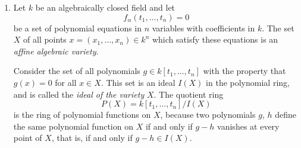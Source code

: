 \begin{enumerate}
\begin{enumerate}
\item Let $f\in C(X)$; let
\[
 U_f=\{x\in X:f(x)\neq0\}
\]
and let
\[
 \widetilde U_f=\{\mathfrak m\in\widetilde X:f\notin\mathfrak m\}.
\]
Show that $\mu(U_f)=\widetilde U_f$. The open sets $U_f$ (resp. $\widetilde U_f$) form a basis of the topology of $X$ (resp. $\widetilde X$) and therefore $\mu$ is a homeomorphism.

Thus $X$ can be reconstructed from the ring of functions $C(X)$.
\end{enumerate}

\noindent\textit{Affine algebraic varieties}

\item Let $k$ be an algebraically closed field and let
\[
 f_\alpha(t_1,\ldots,t_n)=0
\]
be a set of polynomial equations in $n$ variables with coefficients in $k$. The set $X$ of all points $x=(x_1,\ldots,x_n)\in k^n$ which satisfy these equations is an \textit{affine algebraic variety}.

Consider the set of all polynomials $g\in k[t_1,\ldots,t_n]$ with the property that $g(x)=0$ for all $x\in X$. This set is an ideal $I(X)$ in the polynomial ring, and is called the \textit{ideal of the variety} $X$. The quotient ring
\[
 P(X)=k[t_1,\ldots,t_n]/I(X)
\]
is the ring of polynomial functions on $X$, because two polynomials $g$, $h$ define the same polynomial function on $X$ if and only if $g-h$ vanishes at every point of $X$, that is, if and only if $g-h\in I(X)$.
\end{enumerate}
